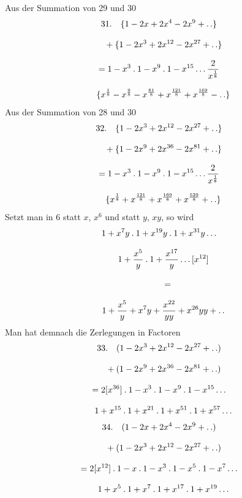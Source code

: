 Aus der Summation von 29 und 30
\[
\begin{gathered}
31.\quad \{1-2x+2x^{4}-2x^{9}+\mathinner{.\,.}\}\\[8pt]\quad{}+\{1-2x^{3}+2x^{12}-2x^{27}+\mathinner{.\,.}\}\\[8pt]
 =1-x^{3}\mathbin{.}1-x^{9}\mathbin{.}1-x^{15}\mathinner{.\,.\,.}\frac{2}{x^{\frac18}}
 \\[8pt]\quad{}\{x^{\frac18}-x^{\frac98}-x^{\frac{81}{8}}+x^{\frac{121}{8}}+x^{\frac{169}{8}}-\mathinner{.\,.}\}
\end{gathered}
\]
Aus der Summation von 28 und 30
\[
\begin{gathered}
32.\quad \{1-2x^{3}+2x^{12}-2x^{27}+\mathinner{.\,.}\}\\[8pt]\quad{}+\{1-2x^{9}+2x^{36}-2x^{81}+\mathinner{.\,.}\}\\[8pt]
 =1-x^{3}\mathbin{.}1-x^{9}\mathbin{.}1-x^{15}\mathinner{.\,.\,.}\frac{2}{x^{\frac18}}
 \\[8pt]\quad{}\{x^{\frac18}+x^{\frac{121}{8}}+x^{\frac{169}{8}}+x^{\frac{529}{8}}+\mathinner{.\,.}\}
\end{gathered}
\]
Setzt man in 6 statt $x$, $x^{6}$ und statt $y$, $xy$, so wird
\[
\begin{gathered}
1+x^{7}y\mathbin{.}1+x^{19}y\mathbin{.}1+x^{31}y\mathinner{.\,.\,.}\\[8pt]\quad{}1+\frac{x^{5}}{y}\mathbin{.}1+\frac{x^{17}}{y}\mathinner{.\,.\,.}[x^{12}]\\[8pt]
\qquad=\\[8pt]\quad{}1+\frac{x^{5}}{y}+x^{7}y+\frac{x^{22}}{yy}+x^{26}yy+\mathinner{.\,.}
\end{gathered}
\]
Man hat demnach die Zerlegungen in Factoren
\[
\begin{gathered}
33.\quad (1-2x^{3}+2x^{12}-2x^{27}+\mathinner{.\,.})\\[8pt]\quad{}+(1-2x^{9}+2x^{36}-2x^{81}+\mathinner{.\,.})\\[8pt]
 =2[x^{36}]\mathbin{.}1-x^{3}\mathbin{.}1-x^{9}\mathbin{.}1-x^{15}\mathinner{.\,.\,.}\\[8pt]\quad{}
 1+x^{15}\mathbin{.}1+x^{21}\mathbin{.}1+x^{51}\mathbin{.}1+x^{57}\mathinner{.\,.\,.}
\end{gathered}
\]
\[
\begin{gathered}
34.\quad (1-2x+2x^{4}-2x^{9}+\mathinner{.\,.})\\[8pt]\quad{}+(1-2x^{3}+2x^{12}-2x^{27}+\mathinner{.\,.})\\[8pt]
 =2[x^{12}]\mathbin{.}1-x\mathbin{.}1-x^{3}\mathbin{.}1-x^{5}\mathbin{.}1-x^{7}\mathinner{.\,.\,.}\\[8pt]\quad{}
 1+x^{5}\mathbin{.}1+x^{7}\mathbin{.}1+x^{17}\mathbin{.}1+x^{19}\mathinner{.\,.\,.}
\end{gathered}
\]
